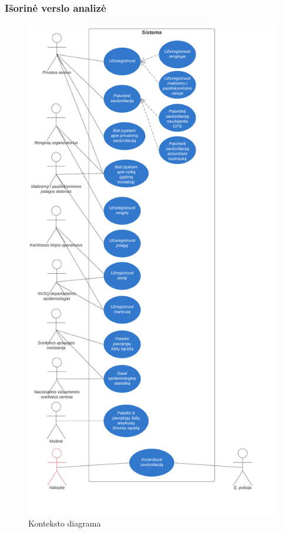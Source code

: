 \documentclass{VUMIFPSkursinis}
\begin{document}
\subsubsection{Išorinė verslo analizė}

\begin{figure}[H]
    \centering
    \includegraphics[scale=0.6]{img/use_case_diagram.png}
    \caption{Konteksto diagrama}
    \label{img:use_case_diagram}
\end{figure}
\end{document}
